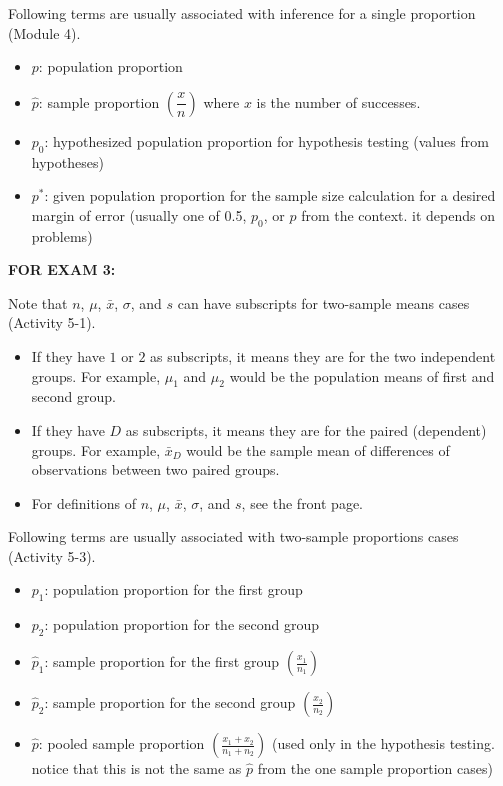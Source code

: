 \documentclass[12pt]{article}
\begin{document}
\noindent Following terms are usually associated with inference for a single proportion (Module 4).
\vspace{-3mm}
\begin{itemize}\itemsep0em
	\item $p$: population proportion
	\item $\hat{p}$: sample proportion $\left( \dfrac{x}{n} \right)$ where $x$ is the number of successes.
	\item $p_0$: hypothesized population proportion for hypothesis testing (values from hypotheses)
	\item $p^*$: given population proportion for the sample size calculation for a desired margin of error (usually one of 0.5, $p_0$, or $p$ from the context. it depends on problems)
\end{itemize}

\pagebreak

\noindent \textbf{FOR EXAM 3:}

\noindent Note that $n$, $\mu$, $\bar{x}$, $\sigma$, and $s$ can have subscripts for two-sample means cases (Activity 5-1).
\vspace{-3mm}
\begin{itemize}\itemsep0em
	\item If they have $1$ or $2$ as subscripts, it means they are for the two independent groups. For example, $\mu_1$ and $\mu_2$ would be the population means of first and second group.
	\item If they have $D$ as subscripts, it means they are for the paired (dependent) groups. For example, $\bar{x}_D$ would be the sample mean of differences of observations between two paired groups.
	\item For definitions of $n$, $\mu$, $\bar{x}$, $\sigma$, and $s$, see the front page.
\end{itemize}

\noindent Following terms are usually associated with two-sample proportions cases (Activity 5-3).
\vspace{-3mm}
\begin{itemize}\itemsep0em
	\item $p_1$: population proportion for the first group
	\item $p_2$: population proportion for the second group
	\item $\hat{p}_1$: sample proportion for the first group $( \frac{x_1}{n_1} )$
	\item $\hat{p}_2$: sample proportion for the second group $( \frac{x_2}{n_2} )$
	\item $\hat{p}$: pooled sample proportion $( \frac{x_1 + x_2}{n_1 + n_2} )$ (used only in the hypothesis testing. notice that this is not the same as $\hat{p}$ from the one sample proportion cases)
\end{itemize}
\end{document}

